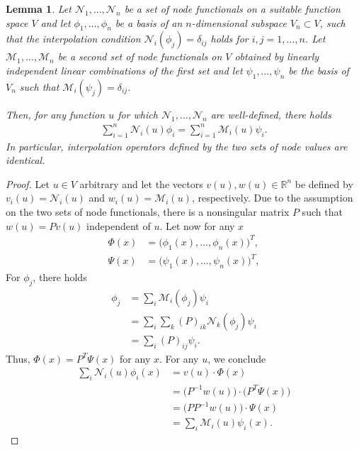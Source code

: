 \documentclass[final]{amsart}%
\newtheorem{lemma}{Lemma}
\newcommand{\0}{\mathaccent23}
\newcommand\R{\mathbb{R}}
\newcommand{\nodal}{\mathcal N}
\begin{document}
\begin{lemma}
    Let $\nodal_1,\dots,\nodal_n$ be a set of node functionals on a suitable function space $V$ and let $\phi_1,\dots,\phi_n$ be a basis of an $n$-dimensional subspace $V_n\subset V$, such that the interpolation condition $\nodal_i(\phi_j) = \delta_{ij}$ holds for $i,j=1,\dots,n$.
    Let $\mathcal M_1,\dots,\mathcal M_n$ be a second set of node functionals on $V$ obtained by linearly independent linear combinations of the first set and let  $\psi_1,\dots,\psi_n$ be the basis of $V_n$ such that $\mathcal M_i(\psi_j) = \delta_{ij}$.
    
    Then, for any function $u$ for which $\nodal_1,\dots,\nodal_n$ are well-defined, there holds
    \begin{gather}
    \label{eq:appc-1}
        \sum_{i=1}^n \nodal_i(u)\phi_i
        =
        \sum_{i=1}^n \mathcal M_i(u)\psi_i.
    \end{gather}
    In particular, interpolation operators defined by the two sets of node values are identical.
\end{lemma}

\begin{proof}
    Let $u\in V$ arbitrary and let the vectors $v(u),w(u)\in\R^n$ be defined by $v_i(u) = \nodal_i(u)$ and $w_i(u) = \mathcal M_i(u)$, respectively.
    Due to the assumption on the two sets of node functionals, there is a nonsingular matrix $P$ such that $w(u) = P v(u)$ independent of $u$. 
    Let now for any $x$
    \begin{align*}
        \Phi(x) &= \bigl(\phi_1(x),\dots,\phi_n(x)\bigr)^T,\\
        \Psi(x) &= \bigl(\psi_1(x),\dots,\psi_n(x)\bigr)^T,
    \end{align*}
    For $\phi_j$, there holds
    \begin{align*}
        \phi_j
        &= \sum_i \mathcal M_i(\phi_j) \psi_i\\
        &= \sum_i\sum_k (P)_{ik} \nodal_k(\phi_j) \psi_i\\
        &= \sum_i (P)_{ij} \psi_i.
    \end{align*}
    Thus, $\Phi(x) = P^{T}\Psi(x)$ for any $x$.
    For any $u$, we conclude
    \begin{align*}
        \sum_i \nodal_i(u)\phi_i(x)
        &= v(u) \cdot \Phi(x)\\
        &= \bigl(P^{-1} w(u)\bigr) \cdot \bigl(P^T \Psi(x)\bigr)\\
        &= \bigl(P P^{-1} w(u)\bigr) \cdot \Psi(x)\\
        &= \sum_i \mathcal M_i(u)\psi_i(x).
    \end{align*}
\end{proof}
\end{document}
